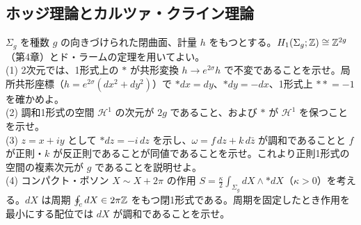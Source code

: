 \subsection{ホッジ理論とカルツァ・クライン理論}

\begin{problem}[難易度 C]\label{ch05-prob-riemann}
$\Sigma_g$ を種数 $g$ の向きづけられた閉曲面、計量 $h$ をもつとする。$H_1(\Sigma_g;\mathbb{Z})\cong\mathbb{Z}^{2g}$（第4章）とド・ラームの定理を用いてよい。\\
(1) 2次元では、1形式上の ${*}$ が共形変換 $h\to e^{2\sigma}h$ で不変であることを示せ。局所共形座標（$h=e^{2\sigma}(dx^2+dy^2)$）で ${*}dx=dy$、${*}dy=-dx$、1形式上 ${**}=-1$ を確かめよ。\\
(2) 調和1形式の空間 $\mathcal H^1$ の次元が $2g$ であること、および ${*}$ が $\mathcal H^1$ を保つことを示せ。\\
(3) $z=x+iy$ として ${*}dz=-i\,dz$ を示し、$\omega=f\,dz+k\,d\bar z$ が調和であることと $f$ が正則・$k$ が反正則であることが同値であることを示せ。これより正則1形式の空間の複素次元が $g$ であることを説明せよ。\\
(4) コンパクト・ボソン $X\sim X+2\pi$ の作用 $S=\frac{\kappa}{2}\int_{\Sigma_g}dX\wedge{*dX}$（$\kappa>0$）を考える。$dX$ は周期 $\oint_{c}dX\in2\pi\mathbb{Z}$ をもつ閉1形式である。周期を固定したとき作用を最小にする配位では $dX$ が調和であることを示せ。
\end{problem}

